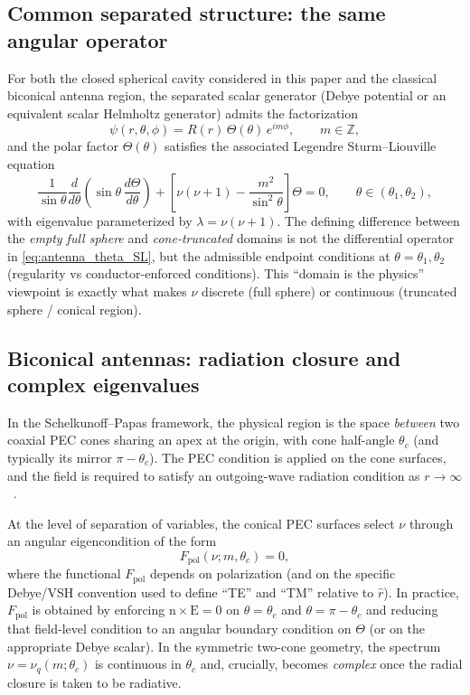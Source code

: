 \documentclass[
  aip,
  amsmath,amssymb,
  preprint
]{revtex4-1}
\begin{document}
\subsection{Common separated structure: the same angular operator}
\label{sec:antenna:common}
For both the closed spherical cavity considered in this paper and the classical biconical antenna region, the separated scalar generator (Debye potential or an equivalent scalar Helmholtz generator) admits the factorization
\begin{equation}
\label{eq:antenna_sep_ansatz}
\psi(r,\theta,\phi)=R(r)\,\Theta(\theta)\,e^{im\phi},
\qquad m\in\mathbb{Z},
\end{equation}
and the polar factor $\Theta(\theta)$ satisfies the associated Legendre Sturm--Liouville equation
\begin{equation}
\label{eq:antenna_theta_SL}
\frac{1}{\sin\theta}\frac{d}{d\theta}\!\left(\sin\theta\,\frac{d\Theta}{d\theta}\right)
+\left[\nu(\nu+1)-\frac{m^2}{\sin^2\theta}\right]\Theta=0,
\qquad \theta\in(\theta_1,\theta_2),
\end{equation}
with eigenvalue parameterized by $\lambda=\nu(\nu+1)$. The defining difference between the \emph{empty full sphere} and \emph{cone-truncated} domains is not the differential operator in \eqref{eq:antenna_theta_SL}, but the admissible endpoint conditions at $\theta=\theta_1,\theta_2$ (regularity vs conductor-enforced conditions). This ``domain is the physics'' viewpoint is exactly what makes $\nu$ discrete (full sphere) or continuous (truncated sphere / conical region).

\subsection{Biconical antennas: radiation closure and complex eigenvalues}
\label{sec:antenna:biconical}
In the Schelkunoff--Papas framework, the physical region is the space \emph{between} two coaxial PEC cones sharing an apex at the origin, with cone half-angle $\theta_c$ (and typically its mirror $\pi-\theta_c$). The PEC condition is applied on the cone surfaces, and the field is required to satisfy an outgoing-wave radiation condition as $r\to\infty$~\cite{Schelkunoff1943,Papas1950}.

At the level of separation of variables, the conical PEC surfaces select $\nu$ through an angular eigencondition of the form
\begin{equation}
\label{eq:antenna_cone_eig_general}
F_{\mathrm{pol}}\!\left(\nu;m,\theta_c\right)=0,
\end{equation}
where the functional $F_{\mathrm{pol}}$ depends on polarization (and on the specific Debye/VSH convention used to define ``TE'' and ``TM'' relative to $\hat r$). In practice, $F_{\mathrm{pol}}$ is obtained by enforcing $\mathrm{n}\times\mathrm{E}=0$ on $\theta=\theta_c$ and $\theta=\pi-\theta_c$ and reducing that field-level condition to an angular boundary condition on $\Theta$ (or on the appropriate Debye scalar). In the symmetric two-cone geometry, the spectrum $\nu=\nu_q(m;\theta_c)$ is continuous in $\theta_c$ and, crucially, becomes \emph{complex} once the radial closure is taken to be radiative.
\end{document}
